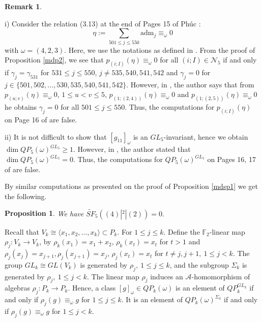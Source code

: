 \documentclass[reqno]{amsart}
\theoremstyle{plain}
\theoremstyle{definition}
\theoremstyle{plain}
\newtheorem{props}[thms]{Proposition}
\theoremstyle{definition}
\newtheorem{rems}[thms]{Remark}
\numberwithin{equation}{section}
\begin{document}
\begin{rems}\
	
i) Consider the relation (3.13) at the end of Pages 15 of Ph\'uc \cite{p24}: 
$$\eta := \sum_{501 \leqslant j \leqslant 550}\mbox{adm}_j \equiv_\omega 0$$
with $\omega = (4,2,3)$. Here, we use the notations as defined in \cite{p24}. From the proof of Proposition \ref{mdp2}, we see that $p_{(i;I)}(\eta) \equiv_\omega 0$ for all $(i;I)\in \mathcal N_5$ if and only if $\gamma_{j} = \gamma_{531}$ for $531 \leqslant j \leqslant 550$, $j \ne 535, 540, 541, 542$ and $\gamma_{j} = 0$ for $j \in \{501,502,\ldots,530, 535, 540, 541, 542\}$.
However, in \cite{p24}, the author says that from $p_{(u;v)}(\eta) \equiv_\omega 0$, $1\leqslant u < v \leqslant 5$, $p_{(1;(2,4))}(\eta) \equiv_\omega 0$ and $p_{(1;(2,5))}(\eta) \equiv_\omega 0$ he obtains $\gamma_{j} = 0$ for all $501\leqslant  j \leqslant 550$. Thus, the computations for $p_{(i;I)}(\eta)$ on Page 16 of \cite{p24} are false.

ii) It is not difficult to show that $[g_{11}]_\omega$ is an $GL_5$-invariant, hence we obtain $\dim QP_5(\omega)^{GL_5} \geqslant 1$. However, in \cite{p24}, the author stated that $\dim QP_5(\omega)^{GL_5} = 0$. Thus, the computations for $QP_5(\omega)^{GL_5}$ on Pages 16, 17 of \cite{p24} are false. 
\end{rems}

By similar computations as presented on the proof of Proposition \ref{mdsp1} we get the following.
\begin{props} We have $\widetilde{SF}_5((4)|^2|(2)) = 0.$
\end{props}


Recall that $V_k \cong \langle x_1, x_2,\ldots, x_k\rangle \subset P_k$. For $1 \leqslant j \leqslant k$. Define the $\mathbb F_2$-linear map $\rho_j:V_k \to V_k$, by $\rho_k(x_1) = x_1+x_2$,  $\rho_k(x_t) = x_t$ for $t > 1$ and $\rho_j(x_j) = x_{j+1}, \rho_j(x_{j+1}) = x_j$, $\rho_j(x_t) = x_t$ for $t \ne j, j+1,\ 1 \leqslant j < k$.  The group $GL_k\cong GL(V_k)$ is generated by $\rho_j,\ 1\leqslant j \leqslant k$, and the subgroup $\Sigma_k$ is generated by $\rho_j,\ 1 \leqslant j < k$. The linear map $\rho_j$ induces an $\mathcal A$-homomorphism of algebras $\rho_j: P_k \to P_k$. Hence, a class $[g]_\omega \in QP_k(\omega)$ is an element of $QP_k^{GL_k}$ if and only if $\rho_j(g) \equiv_\omega g$ for $1 \leqslant j\leqslant k$.  It is an element of $QP_k(\omega)^{\Sigma_k}$ if and only if $\rho_j(g) \equiv_\omega g$ for $1 \leqslant j < k$.
\end{document}
